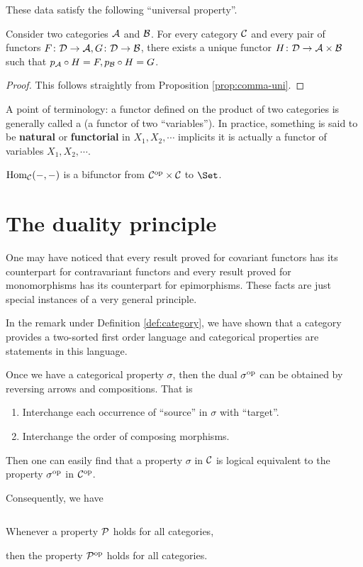  These data satisfy the following ``universal property''.
  \begin{prop}
    Consider two categories ${\cal A}$ and ${\cal B}$. For every category ${\cal C}$ and every pair of functors $F\colon{\cal D}\to{\cal A}, G\colon{\cal D}\to{\cal B}$, there exists a unique functor $H\colon{\cal D}\to{\cal A}\times{\cal B}$ such that $p_{{\cal A}}\circ H=F, p_{{\cal B}}\circ H=G$.
  \end{prop}
  \begin{proof}
    This follows straightly from Proposition \ref{prop:comma-uni}.
  \end{proof}
  A point of terminology: a functor defined on the product of two categories is generally called a  (a functor of two ``variables''). In practice, something is said to be \textbf{natural} or \textbf{functorial} in $X_1,X_2,\cdots$ implicits it is actually a functor of variables $X_1,X_2,\cdots$.
  \begin{exam}
    $\operatorname{Hom}_{{\cal C}}(-,-)$ is a bifunctor from ${\cal C}^{\operatorname{op}}\times{\cal C}$ to $\Set$.
  \end{exam}


\newpage\section{The duality principle}
  One may have noticed that every result proved for covariant functors has its counterpart for contravariant functors and every result proved for monomorphisms has its counterpart for epimorphisms.
  These facts are just special instances of a very general principle.

  In the remark under Definition \ref{def:category}, we have shown that a category provides a two-sorted first order language and categorical properties are statements in this language.

  Once we have a categorical property $\sigma$, then the dual $\sigma^{\operatorname{op}}$ can be obtained by reversing arrows and compositions. That is
  \begin{enumerate}
    \item   Interchange each occurrence of ``source'' in $\sigma$ with ``target''.
    \item   Interchange the order of composing morphisms.
  \end{enumerate}

  Then one can easily find that a property $\sigma$ in ${\cal C}$ is logical equivalent to the property $\sigma^{\operatorname{op}}$ in ${\cal C}^{\operatorname{op}}$.

  Consequently, we have
  \begin{thm}
  $ $
  \begin{center}
    Whenever a property ${\cal P}$ holds for all categories,

    then the property ${\cal P}^{\operatorname{op}}$ holds for all categories.
  \end{center}
  \end{thm}

